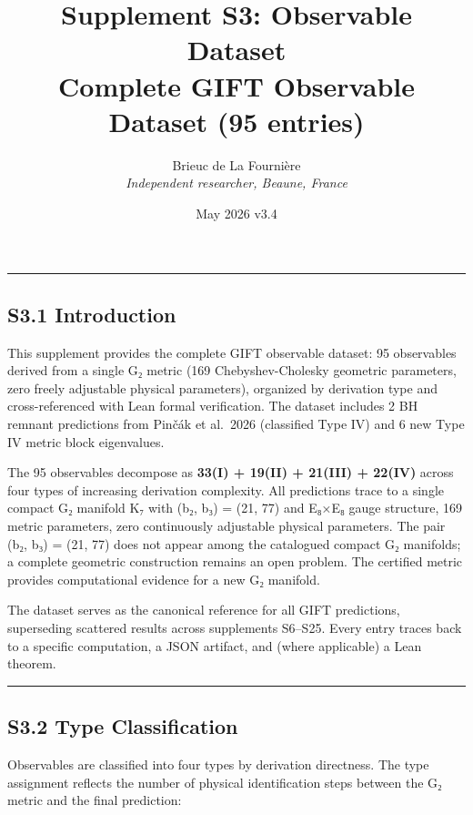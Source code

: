 \documentclass[11pt,a4paper]{article}
\title{%
\LARGE\textbf{Supplement S3: Observable Dataset}\\[0.3em]
\large Complete GIFT Observable Dataset (95 entries)%
}
\author{Brieuc de La Fourni\`ere \\ \textit{Independent researcher, Beaune, France}}
\date{May 2026 \quad\textbar\quad v3.4}
\begin{document}
\maketitle
\noindent\rule{\textwidth}{0.2pt}
\thispagestyle{fancy}

\tableofcontents
\newpage


\subsection{S3.1 Introduction}\label{s3.1-introduction}

This supplement provides the complete GIFT observable dataset: 95 observables derived from a single G₂ metric (169 Chebyshev-Cholesky geometric parameters, zero freely adjustable physical parameters), organized by derivation type and cross-referenced with Lean formal verification. The dataset includes 2 BH remnant predictions from Pinčák et al.~2026 \cite{46} (classified Type IV) and 6 new Type IV metric block eigenvalues.

The 95 observables decompose as \textbf{33(I) + 19(II) + 21(III) + 22(IV)} across four types of increasing derivation complexity. All predictions trace to a single compact G₂ manifold K₇ with (b₂, b₃) = (21, 77) and E₈×E₈ gauge structure, 169 metric parameters, zero continuously adjustable physical parameters. The pair (b₂, b₃) = (21, 77) does not appear among the catalogued compact G₂ manifolds; a complete geometric construction remains an open problem. The certified metric provides computational evidence for a new G₂ manifold.

The dataset serves as the canonical reference for all GIFT predictions, superseding scattered results across supplements S6--S25. Every entry traces back to a specific computation, a JSON artifact, and (where applicable) a Lean theorem.

\begin{center}\rule{0.5\linewidth}{0.5pt}\end{center}

\subsection{S3.2 Type Classification}\label{s3.2-type-classification}

Observables are classified into four types by derivation directness. The type assignment reflects the number of physical identification steps between the G₂ metric and the final prediction:
\end{document}
